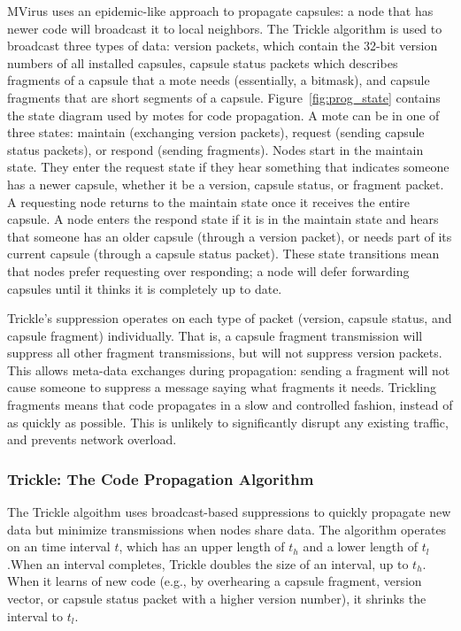 \documentclass[12pt]{article}
\begin{document}
MVirus uses an epidemic-like approach to propagate capsules: a node
that has newer code will broadcast it to local neighbors. The Trickle
algorithm is used to broadcast three types of data: version packets,
which contain the 32-bit version numbers of all installed capsules,
capsule status packets which describes fragments of a capsule that a
mote needs (essentially, a bitmask), and capsule fragments that are
short segments of a capsule. Figure~\ref{fig:prog_state} contains the
state diagram used by motes for code propagation. A mote can be in one
of three states: maintain (exchanging version packets), request
(sending capsule status packets), or respond (sending
fragments). Nodes start in the maintain state. They enter the request
state if they hear something that indicates someone has a newer
capsule, whether it be a version, capsule status, or fragment
packet. A requesting node returns to the maintain state once it
receives the entire capsule. A node enters the respond state if it is
in the maintain state and hears that someone has an older capsule
(through a version packet), or needs part of its current capsule
(through a capsule status packet). These state transitions mean that
nodes prefer requesting over responding; a node will defer forwarding
capsules until it thinks it is completely up to date.

Trickle's suppression operates on each type of packet (version,
capsule status, and capsule fragment) individually. That is, a capsule
fragment transmission will suppress all other fragment transmissions,
but will not suppress version packets. This allows meta-data exchanges
during propagation: sending a fragment will not cause someone to
suppress a message saying what fragments it needs. Trickling fragments
means that code propagates in a slow and controlled fashion, instead
of as quickly as possible. This is unlikely to significantly disrupt
any existing traffic, and prevents network overload.

\subsubsection{Trickle: The Code Propagation Algorithm}

The Trickle algoithm uses broadcast-based suppressions to quickly
propagate new data but minimize transmissions when nodes share
data. The algorithm operates on an time interval $t$, which has an
upper length of $t_{h}$ and a lower length of $t_{l}$.When an interval
completes, Trickle doubles the size of an interval, up to
$t_{h}$. When it learns of new code (e.g., by overhearing a capsule
fragment, version vector, or capsule status packet with a higher
version number), it shrinks the interval to $t_{l}$.
\end{document}

